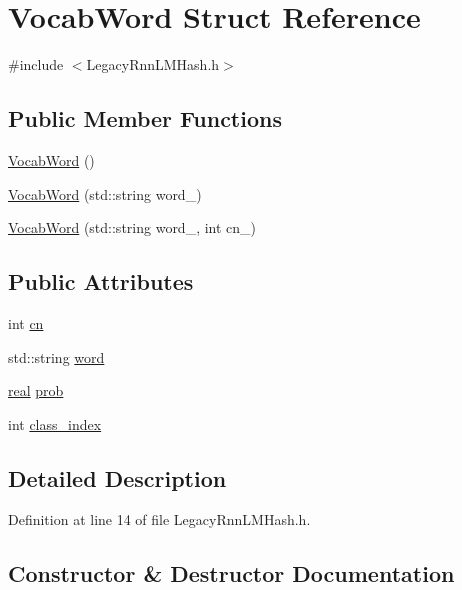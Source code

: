 \hypertarget{struct_vocab_word}{}\section{Vocab\+Word Struct Reference}
\label{struct_vocab_word}


{\ttfamily \#include $<$Legacy\+Rnn\+L\+M\+Hash.\+h$>$}

\subsection*{Public Member Functions}
\begin{DoxyCompactItemize}
\item 
\hyperlink{struct_vocab_word_a646ebb63bd49b93616e7ccf6206e771b}{Vocab\+Word} ()
\item 
\hyperlink{struct_vocab_word_a7710a6ad96f8275c04fa00b3952cfe3d}{Vocab\+Word} (std\+::string word\+\_\+)
\item 
\hyperlink{struct_vocab_word_a8b761a75f67f2b5d8b042462ea055bf4}{Vocab\+Word} (std\+::string word\+\_\+, int cn\+\_\+)
\end{DoxyCompactItemize}
\subsection*{Public Attributes}
\begin{DoxyCompactItemize}
\item 
int \hyperlink{struct_vocab_word_a5c23885e44b41b4c0978b57815d4fdd6}{cn}
\item 
std\+::string \hyperlink{struct_vocab_word_a30acda19149501dac824dd88a8ea8868}{word}
\item 
\hyperlink{_legacy_rnn_l_m_hash_8h_a11d147c64891830c9e79b3315b1b2e21}{real} \hyperlink{struct_vocab_word_aa5aa23bd4f8210809736d776cf71ea56}{prob}
\item 
int \hyperlink{struct_vocab_word_a54cc000fd6cefe74bf359fdd858ae358}{class\+\_\+index}
\end{DoxyCompactItemize}


\subsection{Detailed Description}


Definition at line 14 of file Legacy\+Rnn\+L\+M\+Hash.\+h.



\subsection{Constructor \& Destructor Documentation}

